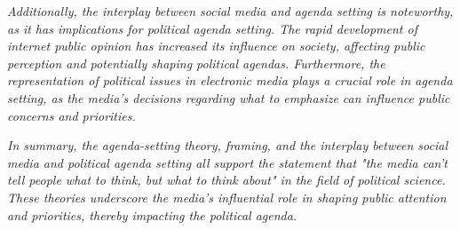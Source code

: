 \documentclass[11pt,a4paper]{article}
\begin{document}
 \textit{Additionally, the interplay between social media and agenda setting is noteworthy, as it has implications for political agenda setting. The rapid development of internet public opinion has increased its influence on society, affecting public perception and potentially shaping political agendas. Furthermore, the representation of political issues in electronic media plays a crucial role in agenda setting, as the media's decisions regarding what to emphasize can influence public concerns and priorities.}

 \textit{In summary, the agenda-setting theory, framing, and the interplay between social media and political agenda setting all support the statement that "the media can't tell people what to think, but what to think about" in the field of political science. These theories underscore the media's influential role in shaping public attention and priorities, thereby impacting the political agenda.}

 
\end{document}
